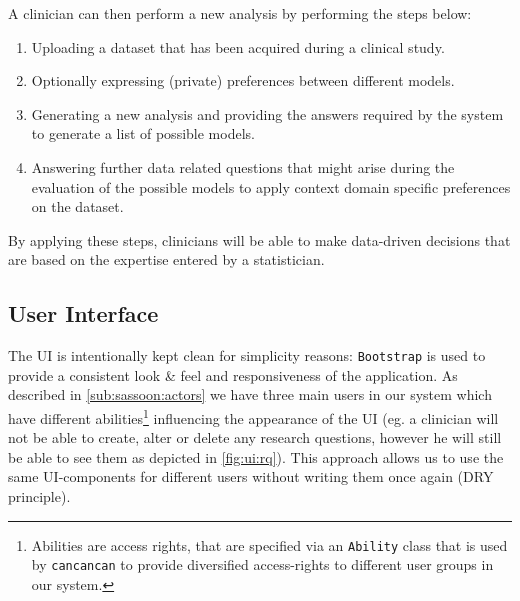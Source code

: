 A clinician can then perform a new analysis by performing the steps below:
 
\begin{enumerate}
	\item Uploading a dataset that has been acquired during a clinical study.
	\item Optionally expressing (private) preferences between different models.
	\item Generating a new analysis and providing the answers required by the system to generate a list of possible models.
	\item Answering further data related questions that might arise during the evaluation of the possible models to apply context domain specific preferences on the dataset.
\end{enumerate}

By applying these steps, clinicians will be able to make data-driven decisions that are based on the expertise entered by a statistician.

\subsection{User Interface}
\label{sub:ui}
The \gls{UI} is intentionally kept clean for simplicity reasons: \texttt{Bootstrap} is used to provide a consistent look \& feel and responsiveness of the application. As described in \autoref{sub:sassoon:actors} we have three main users in our system which have different abilities\footnote{Abilities are access rights, that are specified via an \texttt{Ability} class that is used by \texttt{cancancan} to provide diversified access-rights to different user groups in our system.} influencing the appearance of the \gls{UI} (eg. a clinician will not be able to create, alter or delete any research questions, however he will still be able to see them as depicted in \autoref{fig:ui:rq}). This approach allows us to use the same \gls{UI}-components for different users without writing them once again (\gls{DRY} principle).





